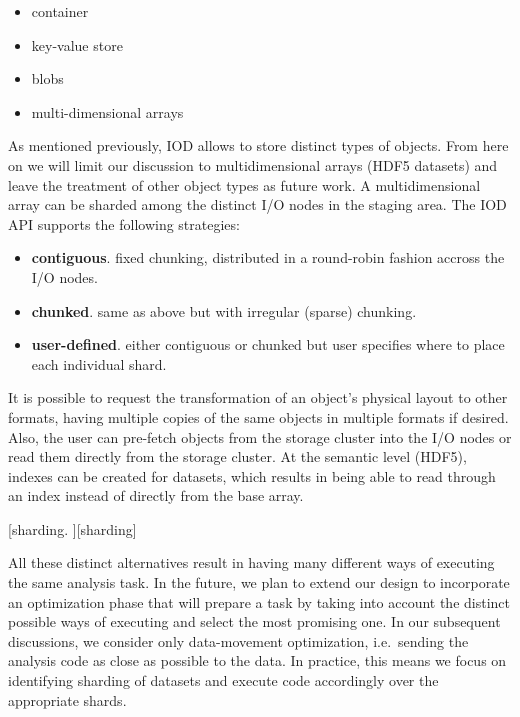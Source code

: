 \documentclass[conference]{IEEEtran}
\begin{document}
\begin{itemize}
\itemsep1pt\parskip0pt
\item
  container
\item
  key-value store
\item
  blobs
\item
  multi-dimensional arrays
\end{itemize}

As mentioned previously, IOD allows to store distinct types of objects.
From here on we will limit our discussion to multidimensional arrays
(HDF5 datasets) and leave the treatment of other object types as future
work. A multidimensional array can be sharded among the distinct I/O
nodes in the staging area. The IOD API supports the following
strategies:

\begin{itemize}
\itemsep1pt\parskip0pt
\item
  \textbf{contiguous}. fixed chunking, distributed in a round-robin
  fashion accross the I/O nodes.
\item
  \textbf{chunked}. same as above but with irregular (sparse) chunking.
\item
  \textbf{user-defined}. either contiguous or chunked but user specifies
  where to place each individual shard.
\end{itemize}

It is possible to request the transformation of an object's physical
layout to other formats, having multiple copies of the same objects in
multiple formats if desired. Also, the user can pre-fetch objects from
the storage cluster into the I/O nodes or read them directly from the
storage cluster. At the semantic level (HDF5), indexes can be created
for datasets, which results in being able to read through an index
instead of directly from the base array.

{[}sharding. \label{sharding}{]}{[}sharding{]}

All these distinct alternatives result in having many different ways of
executing the same analysis task. In the future, we plan to extend our
design to incorporate an optimization phase that will prepare a task by
taking into account the distinct possible ways of executing and select
the most promising one. In our subsequent discussions, we consider only
data-movement optimization, i.e.~sending the analysis code as close as
possible to the data. In practice, this means we focus on identifying
sharding of datasets and execute code accordingly over the appropriate
shards.
\end{document}
